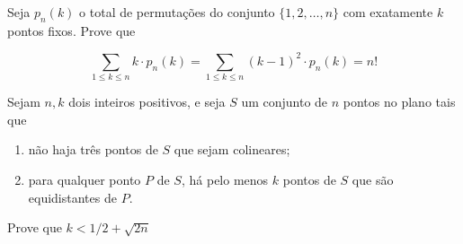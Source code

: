 \begin{questao}
  Seja $p_n(k)$ o total de permutações do conjunto
  $\{1,2,\ldots,n\}$ com exatamente $k$ pontos fixos. Prove que

  $$  \sum_{1 \leq k \leq n}{k \cdot p_n(k)} 
  = \sum_{1 \leq k \leq n}{(k-1)^2 \cdot p_n(k)} = n! $$
\end{questao}

\begin{questao}
  Sejam $n,k$ dois inteiros positivos, e seja $S$ um conjunto de
  $n$ pontos no plano tais que

  \begin{enumerate}
    \item não haja três pontos de $S$ que sejam colineares;

    \item para qualquer ponto $P$ de $S$, há pelo menos $k$ pontos
    de $S$ que são equidistantes de $P$.
  \end{enumerate}

  Prove que $k < 1/2 + \sqrt{2n}$
\end{questao}

